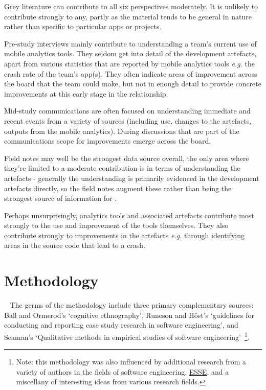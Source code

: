 Grey literature can contribute to all six perspectives moderately. It is unlikely to contribute strongly to any, partly as the material tends to be general in nature rather than specific to particular apps or projects.

Pre-study interviews mainly contribute to understanding a team's current use of mobile analytics tools. They seldom get into detail of the development artefacts, apart from various statistics that are reported by mobile analytics tools \textit{e.g.} the crash rate of the team's app(s). They often indicate areas of improvement across the board that the team could make, but not in enough detail to provide concrete improvements at this early stage in the relationship.

Mid-study communications are often focused on understanding immediate and recent events from a variety of sources (including use, changes to the artefacts, outputs from the mobile analytics). During discussions that are part of the communications scope for improvements emerge across the board.

Field notes may well be the strongest data source overall, the only area where they're limited to a moderate contribution is in terms of understanding the artefacts - generally the understanding is primarily evidenced in the development artefacts directly, so the field notes augment these rather than being the strongest source of information for \uartefacts.

Perhaps unsurprisingly, analytics tools and associated artefacts contribute most strongly to the use and improvement of the tools themselves. They also contribute strongly to improvements in the artefacts \textit{e.g.} through identifying areas in the source code that lead to a crash.


\section{Methodology}~\label{methodology-methodology-section}
The germs of the methodology include three primary complementary sources: Ball and Ormerod's `cognitive ethnography', Runeson and Höst's `guidelines for conducting and reporting case study research in software engineering', and Seaman's `Qualitative methods in empirical studies of software engineering'~\footnote{Note: this methodology was also influenced by additional research from a variety of authors in the fields of software engineering, \href{glossary-esse}{ESSE}, and a miscellany of interesting ideas from various research fields.}.

